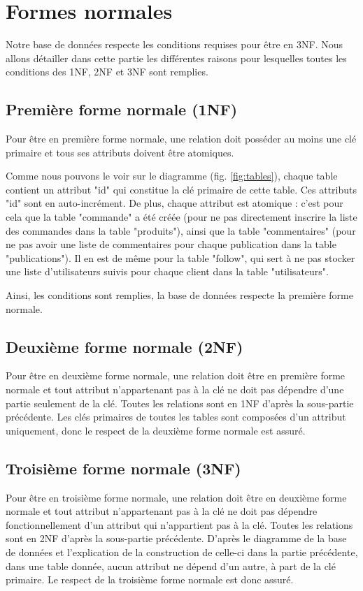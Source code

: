 \documentclass{article}
\begin{document}
\section{Formes normales}

Notre base de données respecte les conditions requises pour être en 3NF. Nous allons détailler dans cette partie les différentes raisons pour lesquelles toutes les conditions des 1NF, 2NF et 3NF sont remplies.

\subsection{Première forme normale (1NF)}

Pour être en première forme normale, une relation doit posséder au moins une clé primaire et tous ses attributs doivent être atomiques.

Comme nous pouvons le voir sur le diagramme (fig. \ref{fig:tables}), chaque table contient un attribut "id" qui constitue la clé primaire de cette table. Ces attributs "id" sont en auto-incrément.
De plus, chaque attribut est atomique : c'est pour cela que la table "commande" a été créée (pour ne pas directement inscrire la liste des commandes dans la table "produits"), ainsi que la table "commentaires" (pour ne pas avoir une liste de commentaires pour chaque publication dans la table "publications"). Il en est de même pour la table "follow", qui sert à ne pas stocker une liste d'utilisateurs suivis pour chaque client dans la table "utilisateurs".

Ainsi, les conditions sont remplies, la base de données respecte la première forme normale.

\subsection{Deuxième forme normale (2NF)}

Pour être en deuxième forme normale, une relation doit être en première forme normale et tout attribut n'appartenant pas à la clé ne doit pas dépendre d'une partie seulement de la clé. Toutes les relations sont en 1NF d'après la sous-partie précédente.
Les clés primaires de toutes les tables sont composées d'un attribut uniquement, donc le respect de la deuxième forme normale est assuré.

\subsection{Troisième forme normale (3NF)}

Pour être en troisième forme normale, une relation doit être en deuxième forme normale et tout attribut n’appartenant pas à la clé ne doit pas dépendre fonctionnellement d’un attribut qui n’appartient pas à la clé. Toutes les relations sont en 2NF d'après la sous-partie précédente.
D'après le diagramme de la base de données et l'explication de la construction de celle-ci dans la partie précédente, dans une table donnée, aucun attribut ne dépend d'un autre, à part de la clé primaire. Le respect de la troisième forme normale est donc assuré.
\end{document}
